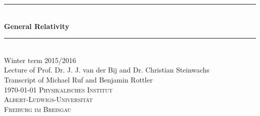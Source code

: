 \newcommand{\HRule}{\rule{\linewidth}{0.5mm}}
\begin{titlepage}
\begin{center}
  \HRule \\[0.4cm]
  { \huge \bfseries General Relativity}\\
  \HRule \\[0.5cm]
  \large Winter term 2015/2016 \\[0.5cm]  
  Lecture of Prof. Dr. J. J. van der Bij and Dr. Christian Steinwachs\\
  Transcript of Michael Ruf and Benjamin Rottler \\[1.5cm]
  \today
  \vfill
  \normalsize
  \textsc{Physikalisches Institut} \\
  \textsc{Albert-Ludwigs-Universität} \\
  \textsc{Freiburg im Breisgau}
\end{center}
\end{titlepage}
